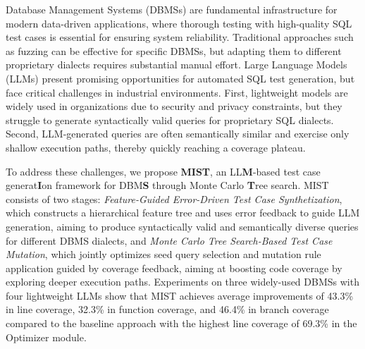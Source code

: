 

Database Management Systems (DBMSs) are fundamental infrastructure for modern data-driven applications, where thorough testing with high-quality SQL test cases is essential for ensuring system reliability. Traditional approaches such as fuzzing can be effective for specific DBMSs, but adapting them to different proprietary dialects requires substantial manual effort. Large Language Models (LLMs) present promising opportunities for automated SQL test generation, but face critical challenges in industrial environments. First, lightweight models are widely used in organizations due to security and privacy constraints, but they struggle to generate syntactically valid queries for proprietary SQL dialects. Second, LLM-generated queries are often semantically similar and exercise only shallow execution paths, thereby quickly reaching a coverage plateau.

To address these challenges, we propose \textbf{MIST}, an LL\textbf{M}-based test case generat\textbf{I}on framework for DBM\textbf{S} through Monte Carlo \textbf{T}ree search. MIST consists of two stages: \textit{Feature-Guided Error-Driven Test Case Synthetization}, which constructs a hierarchical feature tree and uses error feedback to guide LLM generation, aiming to produce syntactically valid and semantically diverse queries for different DBMS dialects, and \textit{Monte Carlo Tree Search-Based Test Case Mutation}, which jointly optimizes seed query selection and mutation rule application guided by coverage feedback, aiming at boosting code coverage by exploring deeper execution paths. Experiments on three widely-used DBMSs with four lightweight LLMs show that MIST achieves average improvements of 43.3\% in line coverage, 32.3\% in function coverage, and 46.4\% in branch coverage compared to the baseline approach with the highest line coverage of 69.3\% in the Optimizer module.
    
